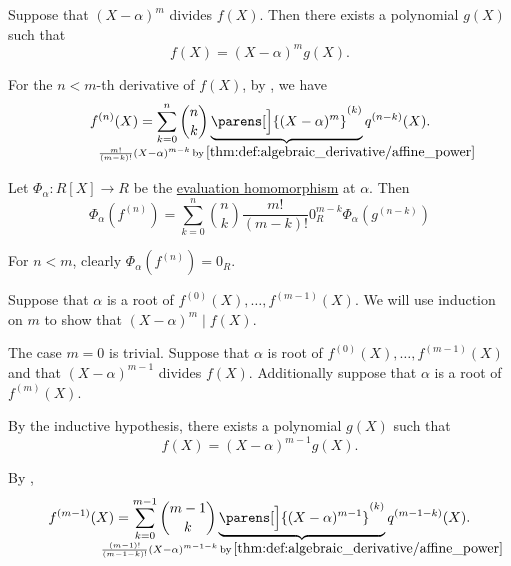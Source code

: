 \begin{defproof}
   Suppose that \( (X - \alpha)^m \) divides \( f(X) \). Then there exists a polynomial \( g(X) \) such that
  \begin{equation*}
    f(X) = (X - \alpha)^m g(X).
  \end{equation*}

  For the \( n < m \)-th derivative of \( f(X) \), by , we have
  \begin{equation*}
    f^{(n)}(X) = \sum_{k=0}^n \binom n k \underbrace{\parens[\Big]{ (X - \alpha)^m }^{(k)}}_{\mathclap{\frac {m!} {(m-k)!} (X - \alpha)^{m-k} \T*{by} \ref{thm:def:algebraic_derivative/affine_power}}} q^{(n-k)}(X).
  \end{equation*}

  Let \( \Phi_\alpha: R[X] \to R \) be the \hyperref[con:evaluation_homomorphism]{evaluation homomorphism} at \( \alpha \). Then
  \begin{equation*}
    \Phi_\alpha(f^{(n)}) = \sum_{k=0}^n \binom n k \frac {m!} {(m-k)!} 0_R^{m-k} \Phi_\alpha(g^{(n-k)})
  \end{equation*}

  For \( n < m \), clearly \( \Phi_\alpha(f^{(n)}) = 0_R \).

   Suppose that \( \alpha \) is a root of \( f^{(0)}(X), \ldots, f^{(m-1)}(X) \). We will use induction on \( m \) to show that \( (X - \alpha)^m \mid f(X) \).

  The case \( m = 0 \) is trivial. Suppose that \( \alpha \) is root of \( f^{(0)}(X), \ldots, f^{(m-1)}(X) \) and that \( (X - \alpha)^{m-1} \) divides \( f(X) \). Additionally suppose that \( \alpha \) is a root of \( f^{(m)}(X) \).

  By the inductive hypothesis, there exists a polynomial \( g(X) \) such that
  \begin{equation*}
    f(X) = (X - \alpha)^{m-1} g(X).
  \end{equation*}

  By ,
  \begin{equation*}
    f^{(m-1)}(X) = \sum_{k=0}^{m-1} \binom {m-1} k \underbrace{\parens[\Big]{ (X - \alpha)^{m - 1} }^{(k)}}_{\mathclap{\frac {(m - 1)!} {(m - 1 - k)!} (X - \alpha)^{m - 1 - k} \T*{by} \ref{thm:def:algebraic_derivative/affine_power}}} q^{(m - 1 - k)}(X).
  \end{equation*}


\end{defproof}
